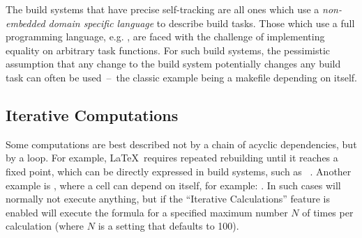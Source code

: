 \noindent
The build systems that have precise self-tracking are all ones which use a
\emph{non-embedded domain specific language} to describe build tasks. Those
which use a full programming language, e.g. \Shake, are faced with the challenge
of implementing equality on arbitrary task functions. For such build systems,
the pessimistic assumption that any change to the build system potentially
changes any build task can often be used~--~the classic example being a makefile
depending on itself.





\subsection{Iterative Computations}\label{sec-iterative-compute}

Some computations are best described not by a chain of acyclic dependencies,
but by a loop. For example, \LaTeX~requires repeated rebuilding until it
reaches a fixed point, which can be directly expressed in build systems, such as
\Pluto~\cite{erdweg2015pluto}. Another example is \Excel, where a cell can
depend on itself, for example: . In such cases \Excel will
normally not execute anything, but if the ``Iterative Calculations'' feature is
enabled \Excel will execute the formula for a specified maximum number $N$ of
times per calculation (where $N$ is a setting that defaults to 100).

